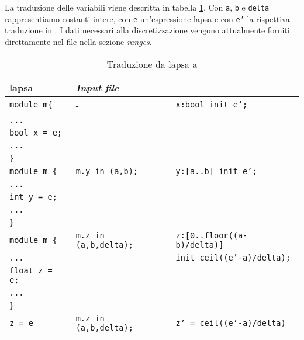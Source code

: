 La traduzione delle variabili viene descritta in tabella \ref{tab:lapsatoprism}. Con \texttt{a}, \texttt{b} e \texttt{delta} rappresentiamo costanti intere, con \texttt{e} un'espressione \ac{lapsa} e con \texttt{e'} la rispettiva traduzione in \prism{}. I dati necessari alla discretizzazione vengono attualmente forniti direttamente nel file \prism{} nella sezione \emph{ranges}.
\begin{table}[htbp!]
\centering
\begin{tabular}{|l|l|l|}
	\hline
	\ac{lapsa} & \emph{Input file} &\prism{} \\
	\hline
	\texttt{module m\{} & - & \texttt{x:bool init e';} \\
	\texttt{...} & & \\
	\texttt{bool x = e;}  & & \\
	\texttt{...} & & \\
	\texttt{\}} & & \\
	\hline
	\texttt{module m \{} & \texttt{m.y in (a,b);} & \texttt{y:[a..b] init e';} \\
	\texttt{...} & & \\
	\texttt{int y = e;} & & \\
	\texttt{...} & & \\
	\texttt{\}} & & \\
	\hline
	\texttt{module m \{} & \texttt{m.z in (a,b,delta);} & \texttt{z:[0..floor((a-b)/delta)]} \\
	\texttt{...} & & \texttt{init ceil((e'-a)/delta);} \\
	\texttt{float z = e;} & & \\
	\texttt{...} & & \\
	\texttt{\}} & & \\
	\hline
	\texttt{z = e} & \texttt{m.z in (a,b,delta);} & \texttt{z' = ceil((e'-a)/delta)} \\
	\hline
\end{tabular}
\caption{Traduzione da \ac{lapsa} a \prism{}}
\label{tab:lapsatoprism}
\end{table}
